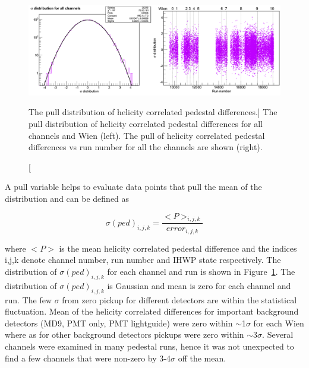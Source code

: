 \begin{singlespace}
\begin{figure}[!h]
	\centering
	\includegraphics[width=15.0cm]{figures/sigmaDistribution}
	\caption
	[The pull distribution of helicity correlated pedestal differences.]
	{The pull distribution of helicity correlated pedestal differences for all channels and Wien (left). The pull of helicity correlated pedestal differences vs run number for all the channels are shown (right).}
	\label{fig:sigmaDistribution}
\end{figure}
\end{singlespace}

A pull variable helps to evaluate data points that pull the mean of the distribution and can be defined as 

\begin{equation} \label{equ:calcPedError}
\sigma(ped)_{i,j,k} = \frac{<P>_{i,j,k}}{error_{i,j,k}}
\end{equation}

\noindent
where $<P>$ is the mean helicity correlated pedestal difference and the indices i,j,k denote channel number, run number and IHWP state respectively.
The distribution of $\sigma(ped)_{i,j,k}$ for each channel and run is shown in Figure~\ref{fig:sigmaDistribution}. 
The distribution of $\sigma(ped)_{i,j,k}$ is Gaussian and mean is zero for each channel and run. The few $\sigma$ from zero pickup for different detectors are within the statistical fluctuation. 
Mean of the helicity correlated differences for important background detectors (MD9, PMT only, PMT lightguide) were zero within $\sim$1$\sigma$ for each Wien where as for other background detectors pickups were zero within $\sim$3$\sigma$. Several channels were examined in many pedestal runs, hence it was not unexpected to find a few channels that were non-zero by 3-4$\sigma$ off the mean.

